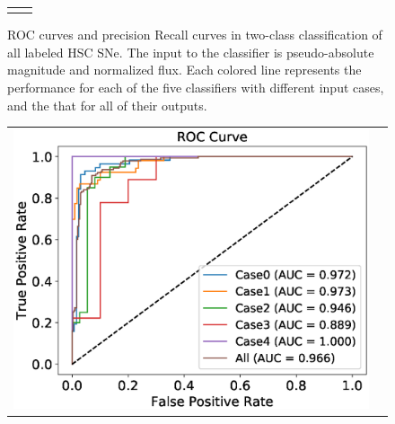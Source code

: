 \documentclass[useamsfonts]{pasj01}
\begin{document}
\begin{figure}[htbp]
\begin{tabular}{cc}
\begin{minipage}{0.5\hsize}
\begin{center}
            \end{center}
        \end{minipage}
    \end{tabular}
    \vspace{2mm}
    \caption{%
    ROC curves and precision Recall curves in two-class classification of all labeled HSC SNe.
    The input to the classifier is pseudo-absolute magnitude and normalized flux.
    Each colored line represents the performance for each of the five classifiers with different input cases, and the that for all of their outputs.
    }
    \label{fig:h2_test_all}
\end{figure}
%
%
%
\begin{figure}[htbp]
    \begin{tabular}{cc}
        \begin{minipage}{0.5\hsize}
            \begin{center}
                \includegraphics[width=\columnwidth]{figures/10_abs-mag_scaled-flux_w-mixup_remove-y_predictions_test_ROC_noedge_spec.eps}
            \end{center}
        \end{minipage}
        \begin{minipage}{0.5\hsize}
            \begin{center}

\end{center}
\end{minipage}
\end{tabular}
\end{figure}
\end{document}
